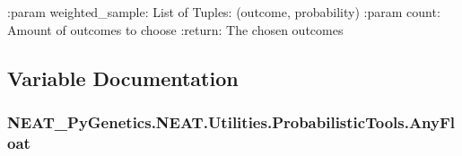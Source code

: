 \+:param weighted\+\_\+sample\+: List of Tuples\+: (outcome, probability) \+:param count\+: Amount of outcomes to choose \+:return\+: The chosen outcomes 

\subsection{Variable Documentation}
\subsubsection[{\texorpdfstring{Any\+Float}{AnyFloat}}]{\setlength{\rightskip}{0pt plus 5cm}N\+E\+A\+T\+\_\+\+Py\+Genetics.\+N\+E\+A\+T.\+Utilities.\+Probabilistic\+Tools.\+Any\+Float}\hypertarget{namespaceNEAT__PyGenetics_1_1NEAT_1_1Utilities_1_1ProbabilisticTools_a77fe590d9378f14206a59d8e6bdec281}{}\label{namespaceNEAT__PyGenetics_1_1NEAT_1_1Utilities_1_1ProbabilisticTools_a77fe590d9378f14206a59d8e6bdec281}
